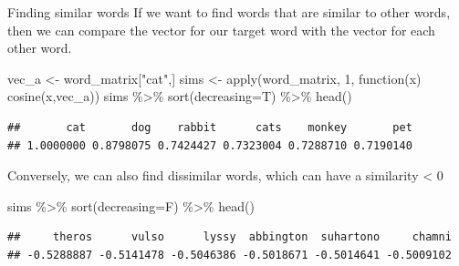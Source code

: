 \documentclass[
  10pt,
  ignorenonframetext,
  aspectratio=169]{beamer}
\newenvironment{Shaded}{\begin{snugshade}}{\end{snugshade}}
\newcommand{\AttributeTok}[1]{\textcolor[rgb]{0.80,0.80,0.80}{#1}}
\newcommand{\ControlFlowTok}[1]{\textcolor[rgb]{0.94,0.87,0.69}{#1}}
\newcommand{\DecValTok}[1]{\textcolor[rgb]{0.86,0.86,0.80}{#1}}
\newcommand{\FunctionTok}[1]{\textcolor[rgb]{0.94,0.94,0.56}{#1}}
\newcommand{\NormalTok}[1]{\textcolor[rgb]{0.80,0.80,0.80}{#1}}
\newcommand{\OtherTok}[1]{\textcolor[rgb]{0.94,0.94,0.56}{#1}}
\newcommand{\SpecialCharTok}[1]{\textcolor[rgb]{0.86,0.64,0.64}{#1}}
\newcommand{\StringTok}[1]{\textcolor[rgb]{0.80,0.58,0.58}{#1}}
\begin{document}
\begin{frame}[fragile]{Finding similar words}
\protect\hypertarget{finding-similar-words}{}
If we want to find words that are similar to other words, then we can
compare the vector for our target word with the vector for each other
word.

\medskip

\scriptsize

\begin{Shaded}
\begin{Highlighting}[]
\NormalTok{vec\_a }\OtherTok{\textless{}{-}}\NormalTok{ word\_matrix[}\StringTok{"cat"}\NormalTok{,] }
\NormalTok{sims }\OtherTok{\textless{}{-}} \FunctionTok{apply}\NormalTok{(word\_matrix, }\DecValTok{1}\NormalTok{, }\ControlFlowTok{function}\NormalTok{(x) }\FunctionTok{cosine}\NormalTok{(x,vec\_a))}
\NormalTok{sims }\SpecialCharTok{\%\textgreater{}\%} \FunctionTok{sort}\NormalTok{(}\AttributeTok{decreasing=}\NormalTok{T) }\SpecialCharTok{\%\textgreater{}\%} \FunctionTok{head}\NormalTok{()}
\end{Highlighting}
\end{Shaded}

\begin{verbatim}
##       cat       dog    rabbit      cats    monkey       pet 
## 1.0000000 0.8798075 0.7424427 0.7323004 0.7288710 0.7190140
\end{verbatim}

Conversely, we can also find dissimilar words, which can have a
similarity \textless{} 0

\begin{Shaded}
\begin{Highlighting}[]
\NormalTok{sims }\SpecialCharTok{\%\textgreater{}\%} \FunctionTok{sort}\NormalTok{(}\AttributeTok{decreasing=}\NormalTok{F) }\SpecialCharTok{\%\textgreater{}\%} \FunctionTok{head}\NormalTok{()}
\end{Highlighting}
\end{Shaded}

\begin{verbatim}
##     theros      vulso      lyssy  abbington  suhartono     chamni 
## -0.5288887 -0.5141478 -0.5046386 -0.5018671 -0.5014641 -0.5009102
\end{verbatim}
\end{frame}
\end{document}
